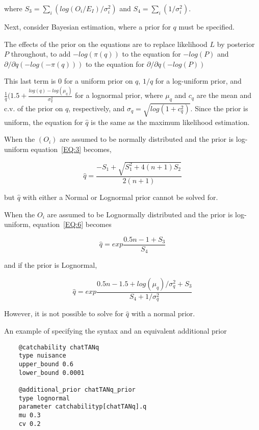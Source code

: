 where $S_3 = \sum_i (log(O_i /E_I)/\sigma_i^2)$ and $S_4 = \sum_i(1/\sigma_i^2)$.

Next, consider Bayesian estimation, where a prior for $q$ must be specified.

The effects of the prior on the equations are to replace likelihood $L$ by posterior $P$ throughout, to add $-log(\pi(q))$ to the equation for $-log(P)$ and $\partial/\partial q(-log(-\pi(q)))$ to the equation for $\partial/\partial q(-log(P))$

This last term is 0 for a uniform prior on $q$, $1/q$ for a log-uniform prior, and $\frac{1}{q}\bigg( 1.5 + \frac{log(q) - log(\mu_q)}{\sigma_q^2}$ for a lognormal prior, where $\mu_q$ and $c_q$ are the mean and c.v. of the prior on $q$, respectively, and $\sigma_q = \sqrt{log(1+c_q^2)}$. Since the prior is uniform, the equation for $\hat q$ is the same as the maximum likelihood estimation.

When the $(O_i)$ are assumed to be normally distributed and the prior is log-uniform equation~\eqref{EQ:3} becomes,

\begin{equation}\label{EQ:7}
\hat q = \frac{-S_1 + \sqrt{S_1^2 + 4(n + 1)S_2}}{2(n+1)}
\end{equation}

but $\hat q$ with either a Normal or Lognormal prior cannot be solved for.

When the $O_i$ are assumed to be Lognormally distributed and the prior is log-uniform, equation~\eqref{EQ:6} becomes


\begin{equation}\label{EQ:8}
\hat q = exp\frac{0.5n -1 + S_3}{S_4}
\end{equation}

and if the prior is Lognormal,

\begin{equation}\label{EQ:9}
\hat q = exp\frac{0.5n -1.5 + log(\mu_q)/\sigma_q^2 + S_3}{S_4 + 1 / \sigma_q^2}
\end{equation}

However, it is not possible to solve for $\hat q$ with a normal prior.

An example of specifying the syntax and an equivalent additional prior

{\small{\begin{verbatim}
	@catchability chatTANq
	type nuisance
	upper_bound 0.6
	lower_bound 0.0001

	@additional_prior chatTANq_prior
	type lognormal
	parameter catchabilityp[chatTANq].q
	mu 0.3
	cv 0.2
\end{verbatim}}}

